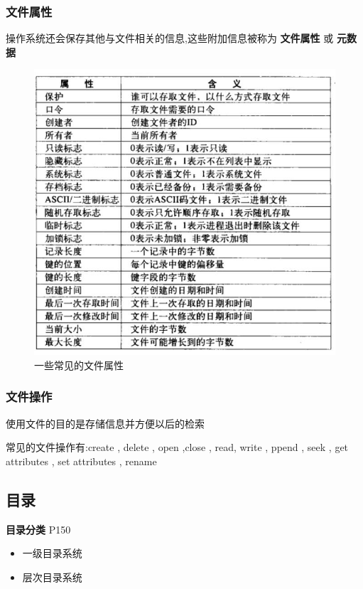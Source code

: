 \documentclass[UTF8,a4paper]{ctexart}
\begin{document}
\subsubsection{文件属性} 
操作系统还会保存其他与文件相关的信息,这些附加信息被称为 \textbf{文件属性} 或 \textbf{元数据}
\begin{figure}[H]
	\centering
	\includegraphics[scale = 0.5]{assets/ModernOperatingSystems/2018-01-11-00-08-45.png}
	\caption{一些常见的文件属性}
\end{figure}


\subsubsection{文件操作} 
使用文件的目的是存储信息并方便以后的检索

常见的文件操作有:create , delete , open ,close , read, write , ppend , seek , get attributes , set attributes , rename

\subsection{目录}
\textbf{目录分类} P150
\begin{itemize}
	\item 一级目录系统
	\item 层次目录系统
\end{itemize}
\end{document}
